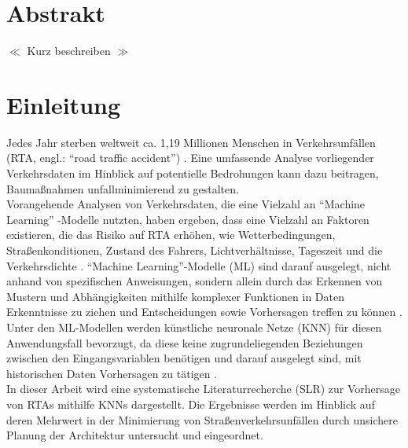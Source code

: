 \documentclass{scrartcl}
\begin{document}

\newpage
\onehalfspacing

\section*{Abstrakt}
$\ll$ Kurz beschreiben $\gg$

\newpage
\tableofcontents
\newpage

\section{Einleitung}

Jedes Jahr sterben weltweit ca. 1,19 Millionen Menschen in Verkehrsunfällen
(RTA, engl.: \enquote{road traffic accident}) \cite{who}.
Eine umfassende Analyse vorliegender Verkehrsdaten im Hinblick auf potentielle
Bedrohungen kann dazu beitragen, Baumaßnahmen unfallminimierend zu gestalten.
\medskip \\
Vorangehende Analysen von Verkehrsdaten, die eine Vielzahl an \enquote{Machine Learning}
-Modelle nutzten, haben ergeben, dass eine Vielzahl an Faktoren existieren,
die das Risiko auf RTA erhöhen, wie Wetterbedingungen, Straßenkonditionen,
Zustand des Fahrers, Lichtverhältnisse, Tageszeit und die Verkehrsdichte \cite{das, qian}.
\enquote{Machine Learning}-Modelle (ML) sind darauf ausgelegt, nicht anhand von
spezifischen Anweisungen, sondern allein durch das Erkennen von Mustern und
Abhängigkeiten mithilfe komplexer Funktionen \cite{qian} in Daten Erkenntnisse
zu ziehen und Entscheidungen sowie Vorhersagen treffen zu können \cite{sap}.
\medskip \\
Unter den ML-Modellen werden künstliche neuronale Netze (KNN) für diesen
Anwendungsfall bevorzugt, da diese keine zugrundeliegenden Beziehungen
zwischen den Eingangsvariablen benötigen und darauf ausgelegt sind,
mit historischen Daten Vorhersagen zu tätigen \cite{qian}.
\medskip \\
In dieser Arbeit wird eine systematische Literaturrecherche (SLR) zur Vorhersage
von RTAs mithilfe KNNs dargestellt. Die Ergebnisse werden im Hinblick auf deren
Mehrwert in der Minimierung von Straßenverkehrsunfällen durch unsichere
Planung der Architektur untersucht und eingeordnet.
\end{document}
